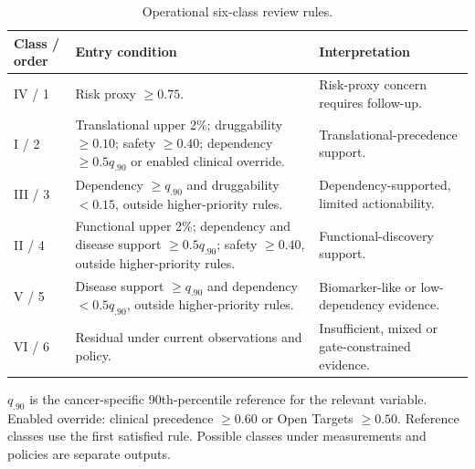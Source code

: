 \begin{table}[!t]
\centering\small
\caption{Operational six-class review rules.}\label{tab:decision-guide}
\begin{tabularx}{\textwidth}{p{}Yp{.25\textwidth}}\toprule
Class / order & Entry condition & Interpretation \\ \midrule
IV / 1 & Risk proxy $\geq0.75$. & Risk-proxy concern requires follow-up. \\
I / 2 & Translational upper 2\%; druggability $\geq0.10$; safety $\geq0.40$; dependency $\geq0.5q_{.90}$ or enabled clinical override. & Translational-precedence support. \\
III / 3 & Dependency $\geq q_{.90}$ and druggability $<0.15$, outside higher-priority rules. & Dependency-supported, limited actionability. \\
II / 4 & Functional upper 2\%; dependency and disease support $\geq0.5q_{.90}$; safety $\geq0.40$, outside higher-priority rules. & Functional-discovery support. \\
V / 5 & Disease support $\geq q_{.90}$ and dependency $<0.5q_{.90}$, outside higher-priority rules. & Biomarker-like or low-dependency evidence. \\
VI / 6 & Residual under current observations and policy. & Insufficient, mixed or gate-constrained evidence. \\
\bottomrule\end{tabularx}
\parbox{\textwidth}{\footnotesize $q_{.90}$ is the cancer-specific 90th-percentile reference for the relevant variable. Enabled override: clinical precedence $\geq0.60$ or Open Targets $\geq0.50$. Reference classes use the first satisfied rule. Possible classes under measurements and policies are separate outputs.}
\end{table}
